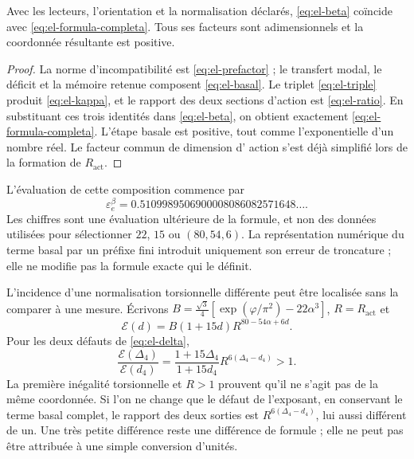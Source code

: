 \begin{theorem}
Avec les lecteurs, l'orientation et la normalisation déclarés,
\eqref{eq:el-beta} coïncide avec \eqref{eq:el-formula-completa}. Tous
ses facteurs sont adimensionnels et la coordonnée résultante est positive.
\end{theorem}
\begin{proof}
La norme d'incompatibilité est \eqref{eq:el-prefactor} ; le transfert modal,
le déficit et la mémoire retenue composent \eqref{eq:el-basal}. Le
triplet \eqref{eq:el-triple} produit \eqref{eq:el-kappa}, et le rapport des
deux sections d'action est \eqref{eq:el-ratio}. En substituant ces
trois identités dans \eqref{eq:el-beta}, on obtient exactement
\eqref{eq:el-formula-completa}. L'étape basale est positive, tout comme
l'exponentielle d'un nombre réel. Le facteur commun de dimension d'
action s'est déjà simplifié lors de la formation de \(R_{\mathrm{act}}\).
\end{proof}

L'évaluation de cette composition commence par
\begin{equation}
 \varepsilon_e^\beta
 =0.5109989506900008086082571648\ldots.
 \label{eq:el-beta-decimal}
\end{equation}
Les chiffres sont une évaluation ultérieure de la formule, et non des données utilisées
pour sélectionner \(22\), \(15\) ou \((80,54,6)\). La représentation
numérique du terme basal par un préfixe fini introduit uniquement son
erreur de troncature ; elle ne modifie pas la formule exacte qui le définit.

L'incidence d'une normalisation torsionnelle différente peut être localisée sans la comparer à une mesure. Écrivons \(B=\frac{\sqrt3}{4}[\exp(\varphi/\pi^2)-22\alpha^3]\), \(R=R_{\mathrm{act}}\) et
\[
 \mathcal E(d)=B(1+15d)R^{80-54\alpha+6d}.
\]
Pour les deux défauts de \eqref{eq:el-delta},
\begin{equation}
 \frac{\mathcal E(\Delta_4)}{\mathcal E(d_4)}
 =\frac{1+15\Delta_4}{1+15d_4}
   R^{6(\Delta_4-d_4)}>1.
 \label{eq:el-normalizacion-beta}
\end{equation}
La première inégalité torsionnelle et \(R>1\) prouvent qu'il ne s'agit pas de la même coordonnée. Si l'on ne change que le défaut de l'exposant, en conservant le terme basal complet, le rapport des deux sorties est \(R^{6(\Delta_4-d_4)}\), lui aussi différent de un. Une très petite différence reste une différence de formule ; elle ne peut pas être attribuée à une simple conversion d'unités.

